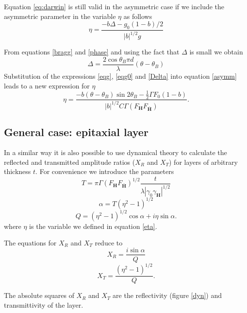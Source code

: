 \documentclass[12pt,oneside,notitlepage,abstracton,a4paper]{scrartcl}
\begin{document}
Equation \ref{eq:darwin} is still valid in the asymmetric case if we include the asymmetric parameter in the variable $\eta$ as follows
\begin{equation}\label{asymm}
 \eta=\frac{-b\Delta-g_0(1-b)/2}{|b|^{1/2}g}
\end{equation}

From equations \ref{bragg} and \ref{phase} and using the fact that $\Delta$ is small we obtain
\begin{equation}\label{Delta}
 \Delta=\frac{2\cos{\theta_B} \pi d}{\lambda}(\theta-\theta_B)
\end{equation}
Substitution of the expressions \ref{eqg}, \ref{eqg0} and \ref{Delta} into equation \ref{asymm} leads to a new expression for $\eta$
\begin{equation}\label{eta}
 \eta=\frac{-b(\theta-\theta_B) \sin{2 \theta_B}-\frac{1}{2}\Gamma F_0(1-b)}{|b|^{1/2}C\Gamma(F_\mathbf{H}F_\mathbf{\bar{H}})}.
\end{equation}


\subsection{General case: epitaxial layer}
In a similar way it is also possible to use dynamical theory to calculate the reflected and transmitted amplitude ratios ($X_R$ and $X_T$) for layers of arbitrary thickness $t$. For convenience we introduce the parameters
\begin{equation}
 T=\pi \Gamma (F_\mathbf{H}F_\mathbf{\bar{H}})^{1/2}\frac{t}{\lambda |\gamma_0 \gamma_\mathbf{H}|^{1/2}}
 \end{equation}
\begin{equation}
 \alpha=T(\eta^2-1)^{1/2}
 \end{equation}
\begin{equation}
 Q=(\eta^2-1)^{1/2}\cos{\alpha} +i\eta \sin{\alpha}.
\end{equation}
where $\eta$ is the variable we defined in equation \ref{eta}.

The equations for $X_R$ and $X_T$ reduce to
\begin{equation}\label{XR}
 X_R=\frac{i \sin{\alpha}}{Q}
 \end{equation}
\begin{equation}\label{XT}
 X_T=\frac{(\eta^2-1)^{1/2}}{Q}.
\end{equation}

The absolute squares of $X_R$ and $X_T$ are the reflectivity (figure \ref{dyn}) and transmittivity of the layer.
\end{document}
